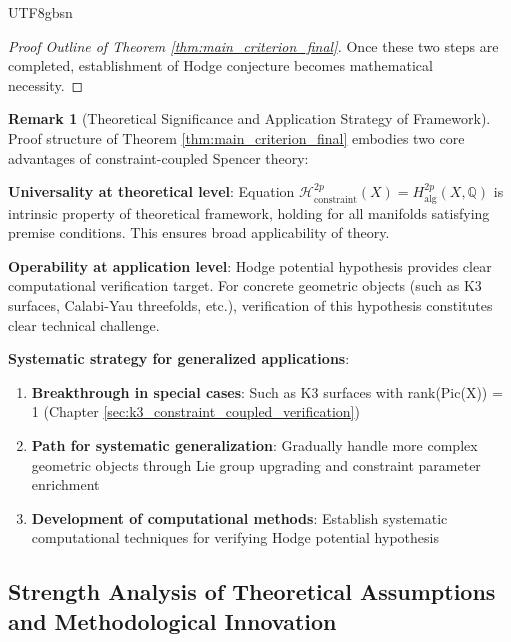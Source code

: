 \documentclass[a4paper,12pt]{extarticle}
\theoremstyle{definition}
\newtheorem{remark}{Remark}[section]
\begin{document}
\begin{CJK}{UTF8}{gbsn}
\begin{proof}[Proof Outline of Theorem \ref{thm:main_criterion_final}]
Once these two steps are completed, establishment of Hodge conjecture becomes mathematical necessity.
\end{proof}

\begin{remark}[Theoretical Significance and Application Strategy of Framework]
Proof structure of Theorem \ref{thm:main_criterion_final} embodies two core advantages of constraint-coupled Spencer theory:

\textbf{Universality at theoretical level}:
Equation $\mathcal{H}_{\text{constraint}}^{2p}(X) = H_{\text{alg}}^{2p}(X, \mathbb{Q})$ is intrinsic property of theoretical framework, holding for all manifolds satisfying premise conditions. This ensures broad applicability of theory.

\textbf{Operability at application level}:
Hodge potential hypothesis provides clear computational verification target. For concrete geometric objects (such as K3 surfaces, Calabi-Yau threefolds, etc.), verification of this hypothesis constitutes clear technical challenge.

\textbf{Systematic strategy for generalized applications}:
\begin{enumerate}
    \item \textbf{Breakthrough in special cases}: Such as K3 surfaces with rank(Pic(X)) = 1 (Chapter \ref{sec:k3_constraint_coupled_verification})
    \item \textbf{Path for systematic generalization}: Gradually handle more complex geometric objects through Lie group upgrading and constraint parameter enrichment
    \item \textbf{Development of computational methods}: Establish systematic computational techniques for verifying Hodge potential hypothesis
\end{enumerate}

\end{remark}


\subsection{Strength Analysis of Theoretical Assumptions and Methodological Innovation}
\label{subsec:assumption_analysis}


\end{CJK}
\end{document}

